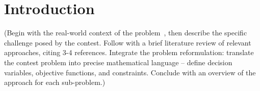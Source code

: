 \section{Introduction}

(Begin with the real-world context of the problem~\cite{example2024},
then describe the specific challenge posed by the contest.
Follow with a brief literature review of relevant approaches, citing 3-4 references.
Integrate the problem reformulation: translate the contest problem into precise
mathematical language -- define decision variables, objective functions, and constraints.
Conclude with an overview of the approach for each sub-problem.)
